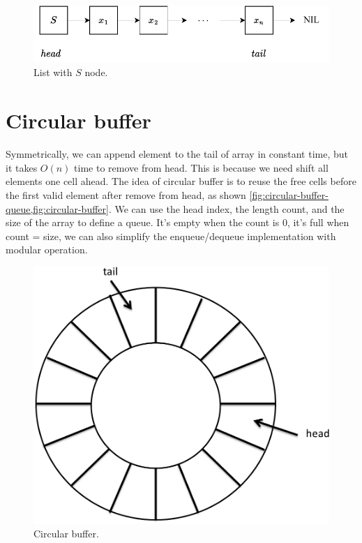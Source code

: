 \documentclass[b5paper]{article}
\begin{document}
\begin{figure}[htbp]
  \centering
  \includegraphics[scale=0.8]{img/slistq}
  \caption{List with $S$ node.}
  \label{fig:list-queue}
\end{figure}

\section{Circular buffer}

Symmetrically, we can append element to the tail of array in constant time, but it takes $O(n)$ time to remove from head. This is because we need shift all elements one cell ahead. The idea of circular buffer is to reuse the free cells before the first valid element after remove from head, as shown \cref{fig:circular-buffer-queue,fig:circular-buffer}. We can use the head index, the length count, and the size of the array to define a queue. It's empty when the count is 0, it's full when count = size, we can also simplify the enqueue/dequeue implementation with modular operation.

\begin{figure}[htbp]
 \centering
 \includegraphics[scale=0.3]{img/ring-buffer}
 \caption{Circular buffer.}
 \label{fig:circular-buffer}
\end{figure}
\end{document}
